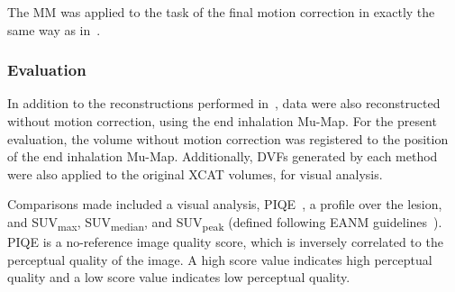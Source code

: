                 The \gls{MM} was applied to the task of the final motion correction in exactly the same way as in~.
            
            \subsubsection{Evaluation} \label{sec:evaluation_of_pet_ct_motion_correction_incorporating_motion_models_using_mlacf_and_complex_gating_schemes_methods_evaluation}
                In addition to the reconstructions performed in~, data were also reconstructed without motion correction, using the end inhalation \gls{Mu-Map}. For the present evaluation, the volume without motion correction was registered to the position of the end inhalation \gls{Mu-Map}. Additionally, \glspl{DVF} generated by each method were also applied to the original \gls{XCAT} volumes, for visual analysis.
                
                Comparisons made included a visual analysis, \gls{PIQE}~\parencite{Chan2000Psychovisually-basedImages}, a profile over the lesion, and \gls{SUV}\textsubscript{max}, \gls{SUV}\textsubscript{median}, and \gls{SUV}\textsubscript{peak} (defined following \gls{EANM} guidelines~\parencite{Boellaard2015FDG2.0}). \gls{PIQE} is a no-reference image quality score, which is inversely correlated to the perceptual quality of the image. A high score value indicates high perceptual quality and a low score value indicates low perceptual quality.
                
        
